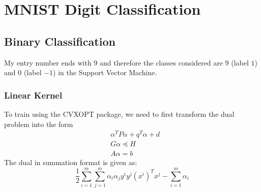 \documentclass[11pt]{article}
\begin{document}
\section{MNIST Digit Classification}

\subsection{Binary Classification}
My entry number ends with $9$ and therefore the classes considered are $9$ (label $1$) and $0$ (label $-1$) in the Support Vector Machine.

\subsubsection{Linear Kernel}
To train using the CVXOPT package, we need to first transform the dual problem into the form
\begin{equation}
  \begin{split}
    &\alpha^T P \alpha + q^T \alpha + d\\
    &G \alpha \preceq H\\
    &A \alpha = b
  \end{split}
\end{equation}
The dual in summation format is given as:
\begin{equation}
  \frac{1}{2}\sum_{i=1}^m\sum_{j=1}^m \alpha_i \alpha_j y^i y^j (x^i)^T x^j - \sum_{i=1}^m \alpha_i
\end{equation}
\end{document}
